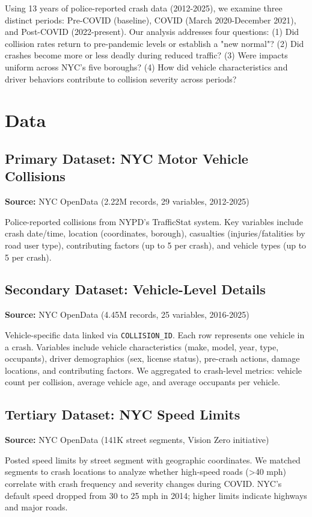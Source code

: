 \documentclass[10pt]{article}\usepackage[]{graphicx}\usepackage[]{xcolor}
\begin{document}
Using 13 years of police-reported crash data (2012-2025), we examine three distinct periods: Pre-COVID (baseline), COVID (March 2020-December 2021), and Post-COVID (2022-present). Our analysis addresses four questions: (1) Did collision rates return to pre-pandemic levels or establish a "new normal"? (2) Did crashes become more or less deadly during reduced traffic? (3) Were impacts uniform across NYC's five boroughs? (4) How did vehicle characteristics and driver behaviors contribute to collision severity across periods?

\section{Data}

\subsection{Primary Dataset: NYC Motor Vehicle Collisions}
\textbf{Source:} NYC OpenData (2.22M records, 29 variables, 2012-2025)

Police-reported collisions from NYPD's TrafficStat system. Key variables include crash date/time, location (coordinates, borough), casualties (injuries/fatalities by road user type), contributing factors (up to 5 per crash), and vehicle types (up to 5 per crash).

\subsection{Secondary Dataset: Vehicle-Level Details}
\textbf{Source:} NYC OpenData (4.45M records, 25 variables, 2016-2025)

Vehicle-specific data linked via \texttt{COLLISION\_ID}. Each row represents one vehicle in a crash. Variables include vehicle characteristics (make, model, year, type, occupants), driver demographics (sex, license status), pre-crash actions, damage locations, and contributing factors. We aggregated to crash-level metrics: vehicle count per collision, average vehicle age, and average occupants per vehicle.

\subsection{Tertiary Dataset: NYC Speed Limits}
\textbf{Source:} NYC OpenData (141K street segments, Vision Zero initiative)

Posted speed limits by street segment with geographic coordinates. We matched segments to crash locations to analyze whether high-speed roads (>40 mph) correlate with crash frequency and severity changes during COVID. NYC's default speed dropped from 30 to 25 mph in 2014; higher limits indicate highways and major roads.
\end{document}
